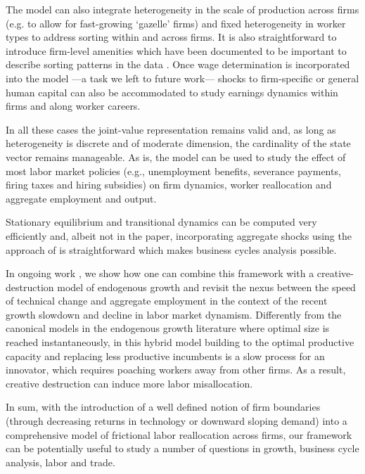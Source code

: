 The model can also integrate heterogeneity in the scale of production across firms (e.g. to allow for fast-growing `gazelle' firms) and fixed heterogeneity in worker types to address sorting within and across firms.
It is also straightforward to introduce firm-level amenities which have been documented to be important to describe sorting patterns in the data \citep{sorkin2018ranking}.
Once wage determination is incorporated into the model ---a task we left to future work--- shocks to firm-specific or general human capital can also be accommodated to study earnings dynamics within firms and along worker careers.

In all these cases the joint-value representation remains valid and, as long as heterogeneity is discrete and of moderate dimension, the cardinality of the state vector remains manageable.
As is, the model can be used to study the effect of most labor market policies (e.g., unemployment benefits, severance payments, firing taxes and hiring subsidies) on firm dynamics, worker reallocation and aggregate employment and output.

Stationary equilibrium and transitional dynamics can be computed very efficiently and, albeit not in the paper, incorporating aggregate shocks using the approach of \citet{boppart2018exploiting} is straightforward which makes business cycles analysis possible.

In ongoing work \citep{BEMV2021growth}, we show how one can combine this framework with a creative-destruction model of endogenous growth and revisit the nexus between the speed of technical change and aggregate employment \citep{aghion1994growth} in the context of the recent growth slowdown and decline in labor market dynamism. Differently from the canonical models in the endogenous growth literature where optimal size is reached instantaneously, in this hybrid model building to the optimal productive capacity and replacing less productive incumbents is a slow process for an innovator, which requires poaching workers away from other firms. As a result, creative destruction can induce more labor misallocation.

In sum, with the introduction of a well defined notion of firm boundaries (through decreasing returns in technology or downward sloping demand) into a  comprehensive model of frictional labor reallocation across firms, our framework can be potentially useful to study a number of questions in growth, business cycle analysis, labor and trade.

\newpage
\renewcommand{\baselinestretch}{1.04} {\small


}

\newpage
\setcounter{page}{1}
\clearpage\newpage




\newpage
\setcounter{page}{1}
\clearpage\newpage




